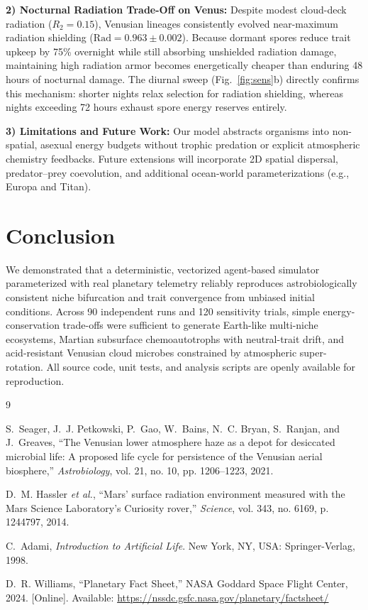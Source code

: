 \documentclass[conference]{IEEEtran}
\begin{document}
\textbf{2) Nocturnal Radiation Trade-Off on Venus:} Despite modest cloud-deck radiation ($R_2 = 0.15$), Venusian lineages consistently evolved near-maximum radiation shielding ($\text{Rad} = 0.963 \pm 0.002$). Because dormant spores reduce trait upkeep by 75\% overnight while still absorbing unshielded radiation damage, maintaining high radiation armor becomes energetically cheaper than enduring 48 hours of nocturnal damage. The diurnal sweep (Fig.~\ref{fig:sens}b) directly confirms this mechanism: shorter nights relax selection for radiation shielding, whereas nights exceeding 72 hours exhaust spore energy reserves entirely.

\textbf{3) Limitations and Future Work:} Our model abstracts organisms into non-spatial, asexual energy budgets without trophic predation or explicit atmospheric chemistry feedbacks. Future extensions will incorporate 2D spatial dispersal, predator--prey coevolution, and additional ocean-world parameterizations (e.g., Europa and Titan).

\section{Conclusion}
We demonstrated that a deterministic, vectorized agent-based simulator parameterized with real planetary telemetry reliably reproduces astrobiologically consistent niche bifurcation and trait convergence from unbiased initial conditions. Across 90 independent runs and 120 sensitivity trials, simple energy-conservation trade-offs were sufficient to generate Earth-like multi-niche ecosystems, Martian subsurface chemoautotrophs with neutral-trait drift, and acid-resistant Venusian cloud microbes constrained by atmospheric super-rotation. All source code, unit tests, and analysis scripts are openly available for reproduction.

\begin{thebibliography}{9}

S.~Seager, J.~J. Petkowski, P.~Gao, W.~Bains, N.~C. Bryan, S.~Ranjan, and J.~Greaves, ``The Venusian lower atmosphere haze as a depot for desiccated microbial life: A proposed life cycle for persistence of the Venusian aerial biosphere,'' \textit{Astrobiology}, vol. 21, no. 10, pp. 1206--1223, 2021.

D.~M. Hassler \textit{et al.}, ``Mars' surface radiation environment measured with the Mars Science Laboratory's Curiosity rover,'' \textit{Science}, vol. 343, no. 6169, p. 1244797, 2014.

C.~Adami, \textit{Introduction to Artificial Life}. New York, NY, USA: Springer-Verlag, 1998.

D.~R. Williams, ``Planetary Fact Sheet,'' NASA Goddard Space Flight Center, 2024. [Online]. Available: \url{https://nssdc.gsfc.nasa.gov/planetary/factsheet/}

\end{thebibliography}
\end{document}
